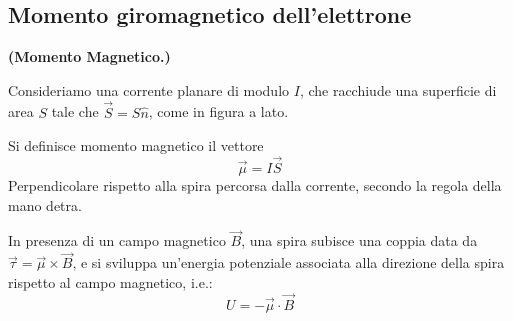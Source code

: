 \documentclass[../main.tex]{subfiles}
\begin{document}
\subsection{Momento giromagnetico dell'elettrone}
 
\begin{definition}
    \textbf{(Momento Magnetico.)}
    
    Consideriamo una corrente planare di modulo $I$, che racchiude una superficie di area $S$ tale che \(\Vec{S} = S\hat{n}\), come in figura a lato.
    
    Si definisce momento magnetico il vettore 
    \begin{equation}
        \Vec{\mu} = I\Vec{S}
        \label{eq:magn_moment}
    \end{equation}
    Perpendicolare rispetto alla spira percorsa dalla corrente, secondo la regola della mano detra.
\end{definition}

In presenza di un campo magnetico $\Vec{B}$, una spira subisce una coppia data da \(\Vec\tau = \Vec\mu \times \Vec{B} \), e si sviluppa un'energia potenziale associata alla direzione della spira rispetto al campo magnetico, i.e.:
\begin{equation}
    \boxed{U = -\Vec\mu\cdot\Vec{B}}
    \label{eq:potential_energy_magn_mom}
\end{equation}
\end{document}
